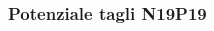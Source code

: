 \begin{frame}
\frametitle{Potenziale tagli N19P19}
\begin{columns}

\begin{column}{0.25 \textwidth}
\begin{center}
\begin{figure}[!h]
          \end{figure}
\end{center}
\end{column}

\begin{column}{0.25 \textwidth}
\begin{center}
\begin{figure}[!h]
\end{figure}
\end{center}
\end{column}

\begin{column}{0.25 \textwidth}
\begin{center}
\begin{figure}[!h]
\end{figure}
\end{center}
\end{column}

\begin{column}{0.25 \textwidth}
\begin{center}
\begin{figure}[!h]
\end{figure}
\end{center}
\end{column}

\end{columns}
\end{frame}

